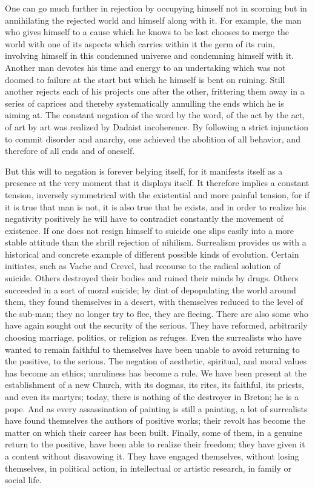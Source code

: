 \documentclass[11pt]{article}
\begin{document}
One can go much further in rejection by occupying himself not in scorning but in annihilating the rejected world and himself along with it. For example, the man who gives himself to a cause which he knows to be lost chooses to merge the world with one of its aspects which carries within it the germ of its ruin, involving himself in this condemned universe and condemning himself with it. Another man devotes his time and energy to an undertaking which was not doomed to failure at the start but which he himself is bent on ruining. Still another rejects each of his projects one after the other, frittering them away in a series of caprices and thereby systematically annulling the ends which he is aiming at. The constant negation of the word by the word, of the act by the act, of art by art was realized by Dadaist incoherence. By following a strict injunction to commit disorder and anarchy, one achieved the abolition of all behavior, and therefore of all ends and of oneself.

But this will to negation is forever belying itself, for it manifests itself as a presence at the very moment that it displays itself. It therefore implies a constant tension, inversely symmetrical with the existential and more painful tension, for if it is true that man is not, it is also true that he exists, and in order to realize his negativity positively he will have to contradict constantly the movement of existence. If one does not resign himself to suicide one slips easily into a more stable attitude than the shrill rejection of nihilism. Surrealism provides us with a historical and concrete example of different possible kinds of evolution. Certain initiates, such as Vache and Crevel, had recourse to the radical solution of suicide. Others destroyed their bodies and ruined their minds by drugs. Others succeeded in a sort of moral suicide; by dint of depopulating the world around them, they found themselves in a desert, with themselves reduced to the level of the sub-man; they no longer try to flee, they are fleeing. There are also some who have again sought out the security of the serious. They have reformed, arbitrarily choosing marriage, politics, or religion as refuges. Even the surrealists who have wanted to remain faithful to themselves have been unable to avoid returning to the positive, to the serious. The negation of aesthetic, spiritual, and moral values has become an ethics; unruliness has become a rule. We have been present at the establishment of a new Church, with its dogmas, its rites, its faithful, its priests, and even its martyrs; today, there is nothing of the destroyer in Breton; he is a pope. And as every assassination of painting is still a painting, a lot of surrealists have found themselves the authors of positive works; their revolt has become the matter on which their career has been built. Finally, some of them, in a genuine return to the positive, have been able to realize their freedom; they have given it a content without disavowing it. They have engaged themselves, without losing themselves, in political action, in intellectual or artistic research, in family or social life.
\end{document}
